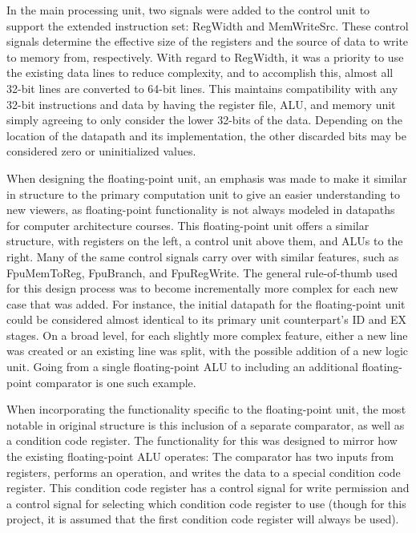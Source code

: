 \documentclass[
    paper=letter,
    parskip=half,
    fontsize=12pt,
    titlepage=firstiscover,
    toc=bibliography,
    numbers=endperiod
]{scrartcl}
\begin{document}
In the main processing unit, two signals were added to the control unit
to support the extended instruction set: RegWidth and MemWriteSrc. These
control signals determine the effective size of the registers and the
source of data to write to memory from, respectively. With regard to
RegWidth, it was a priority to use the existing data lines to reduce
complexity, and to accomplish this, almost all 32-bit lines are
converted to 64-bit lines. This maintains compatibility with any 32-bit
instructions and data by having the register file, ALU, and memory unit
simply agreeing to only consider the lower 32-bits of the data.
Depending on the location of the datapath and its implementation, the
other discarded bits may be considered zero or uninitialized values.

When designing the floating-point unit, an emphasis was made to make it
similar in structure to the primary computation unit to give an easier
understanding to new viewers, as floating-point functionality is not
always modeled in datapaths for computer architecture courses. This
floating-point unit offers a similar structure, with registers on the
left, a control unit above them, and ALUs to the right. Many of the same
control signals carry over with similar features, such as FpuMemToReg,
FpuBranch, and FpuRegWrite. The general rule-of-thumb used for this
design process was to become incrementally more complex for each new
case that was added. For instance, the initial datapath for the
floating-point unit could be considered almost identical to its primary
unit counterpart's ID and EX stages. On a broad level, for each slightly
more complex feature, either a new line was created or an existing line
was split, with the possible addition of a new logic unit. Going from a
single floating-point ALU to including an additional floating-point
comparator is one such example.

When incorporating the functionality specific to the floating-point
unit, the most notable in original structure is this inclusion of a
separate comparator, as well as a condition code register. The
functionality for this was designed to mirror how the existing
floating-point ALU operates: The comparator has two inputs from
registers, performs an operation, and writes the data to a special
condition code register. This condition code register has a control
signal for write permission and a control signal for selecting which
condition code register to use (though for this project, it is assumed
that the first condition code register will always be used).
\end{document}
